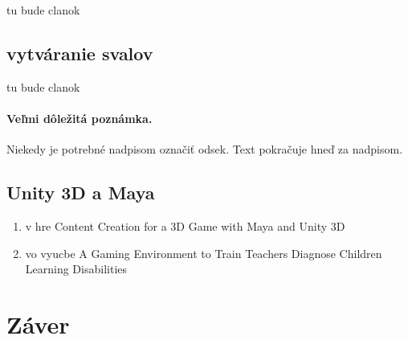 \documentclass[10pt,twoside,slovak,a4paper]{article}
\begin{document}
tu bude clanok



\subsection{vytváranie svalov} \label{pouzitie:sval}

tu bude clanok

\paragraph{Veľmi dôležitá poznámka.}
Niekedy je potrebné nadpisom označiť odsek. Text pokračuje hneď za nadpisom.


\subsection{Unity 3D a Maya} \label{pouzitie:unity}
\begin{enumerate}
\item v hre
Content Creation for a 3D Game with Maya and Unity 3D
\item vo vyucbe
A Gaming Environment to Train Teachers Diagnose Children Learning Disabilities

\end{enumerate}


\section{Záver} \label{zaver} %






\end{document}
